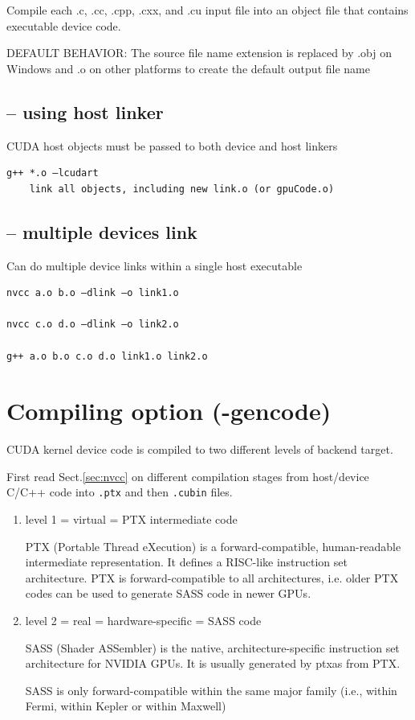 Compile each .c, .cc, .cpp, .cxx, and .cu input file into an object file that contains executable device code.

DEFAULT BEHAVIOR: The source file name extension is replaced by .obj on Windows
and .o on other platforms to create the default output file name

\subsection{-- using host linker}

CUDA host objects must be passed to both device and host linkers

\begin{verbatim}
g++ *.o –lcudart
	link all objects, including new link.o (or gpuCode.o)

\end{verbatim}

\subsection{-- multiple devices link}

Can do multiple device links within a single host executable

\begin{verbatim}
nvcc a.o b.o –dlink –o link1.o

nvcc c.o d.o –dlink –o link2.o

g++ a.o b.o c.o d.o link1.o link2.o
\end{verbatim}

\section{Compiling option (-gencode)}
\label{sec:Compile_option}
\label{sec:nvcc_-gencode-option}

CUDA kernel device code is compiled to two different levels of backend target.

First read Sect.\ref{sec:nvcc} on different compilation stages from host/device C/C++ code into 
\verb!.ptx! and then \verb!.cubin! files. 
\begin{enumerate}
  \item level 1 = virtual = PTX intermediate code
  
  PTX (Portable Thread eXecution) is a forward-compatible, human-readable
  intermediate representation.
  It defines a RISC-like instruction set architecture. PTX is forward-compatible
  to all architectures, i.e. older PTX codes can be used to generate SASS code in newer GPUs.
  
  
  \item level 2 = real = hardware-specific = SASS code 
  
  SASS (Shader ASSembler) is the native, architecture-specific instruction set
  architecture for NVIDIA GPUs. It is usually generated by ptxas from PTX.
  
  SASS is only forward-compatible within the same major family (i.e., within
  Fermi, within Kepler or within Maxwell)
  
\end{enumerate}


